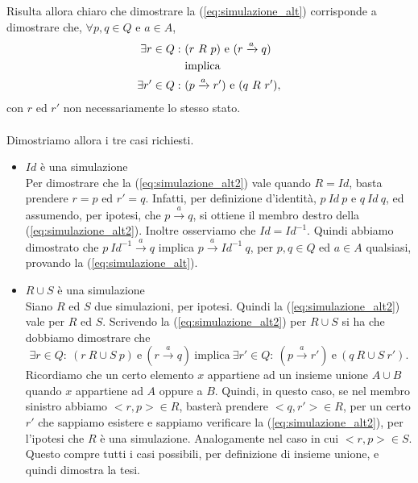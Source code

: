     Risulta allora chiaro che dimostrare la (\ref{eq:simulazione_alt}) corrisponde a dimostrare che, $\forall p,q\in Q$ e $a\in A$,
    \begin{align}
        \exists r\in Q:\ &(r\ R\ p)\ \mbox{e}\ (r \xrightarrow{a} q) \notag\\
        &\mbox{implica} \label{eq:simulazione_alt2}\\
        \exists r'\in Q:\ &(p \xrightarrow{a} r')\ \mbox{e}\ (q\ R\ r'), \notag
    \end{align}
    con $r$ ed $r'$ non necessariamente lo stesso stato.\\
    \\
    Dimostriamo allora i tre casi richiesti.
    
    \begin{itemize}
        \item $Id$ è una simulazione\\
            Per dimostrare che la (\ref{eq:simulazione_alt2}) vale quando $R=Id$, basta prendere $r=p$ ed $r'=q$. Infatti, per definizione d'identità, $p\ Id\ p$ e $q\ Id\ q$, ed assumendo, per ipotesi, che $p \xrightarrow{a} q$, si ottiene il membro destro della (\ref{eq:simulazione_alt2}). Inoltre osserviamo che $Id=Id^{-1}$. Quindi abbiamo dimostrato che $p\ Id^{-1}\xrightarrow{a} q$ implica $p \xrightarrow{a}Id^{-1}\ q$, per $p,q\in Q$ ed $a\in A$ qualsiasi, provando la (\ref{eq:simulazione_alt}).
        \item $R \cup S$ è una simulazione\\
            Siano $R$ ed $S$ due simulazioni, per ipotesi. Quindi la (\ref{eq:simulazione_alt2}) vale per $R$ ed $S$. Scrivendo la (\ref{eq:simulazione_alt2}) per $R \cup S$ si ha che dobbiamo dimostrare che
            \begin{equation*}
                \exists r\in Q:\ (r\ R \cup S\ p)\ \mbox{e}\ (r \xrightarrow{a} q)\ \mbox{implica}\ \exists r'\in Q:\ (p \xrightarrow{a} r')\ \mbox{e}\ (q\ R \cup S\ r').
            \end{equation*}
            Ricordiamo che un certo elemento $x$ appartiene ad un insieme unione $A \cup B$ quando $x$ appartiene ad $A$ oppure a $B$. Quindi, in questo caso, se nel membro sinistro abbiamo $<r,p>\in R$, basterà prendere $<q,r'>\in R$, per un certo $r'$ che sappiamo esistere e sappiamo verificare la (\ref{eq:simulazione_alt2}), per l'ipotesi che $R$ è una simulazione. Analogamente nel caso in cui $<r,p> \in S$. Questo compre tutti i casi possibili, per definizione di insieme unione, e quindi dimostra la tesi.

\end{itemize}
